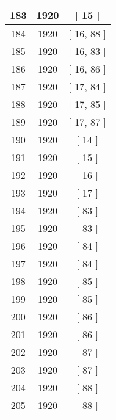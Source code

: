 \begin{center}
\begin{longtable}[H]{|| c c c ||}
\hline
183 & 1920 & [ 15 ] \\ 
\hline
184 & 1920 & [ 16, 88 ] \\ 
\hline
185 & 1920 & [ 16, 83 ] \\ 
\hline
186 & 1920 & [ 16, 86 ] \\ 
\hline
187 & 1920 & [ 17, 84 ] \\ 
\hline
188 & 1920 & [ 17, 85 ] \\ 
\hline
189 & 1920 & [ 17, 87 ] \\ 
\hline
190 & 1920 & [ 14 ] \\ 
\hline
191 & 1920 & [ 15 ] \\ 
\hline
192 & 1920 & [ 16 ] \\ 
\hline
193 & 1920 & [ 17 ] \\ 
\hline
194 & 1920 & [ 83 ] \\ 
\hline
195 & 1920 & [ 83 ] \\ 
\hline
196 & 1920 & [ 84 ] \\ 
\hline
197 & 1920 & [ 84 ] \\ 
\hline
198 & 1920 & [ 85 ] \\ 
\hline
199 & 1920 & [ 85 ] \\ 
\hline
200 & 1920 & [ 86 ] \\ 
\hline
201 & 1920 & [ 86 ] \\ 
\hline
202 & 1920 & [ 87 ] \\ 
\hline
203 & 1920 & [ 87 ] \\ 
\hline
204 & 1920 & [ 88 ] \\ 
\hline
205 & 1920 & [ 88 ] \\ 
\hline
\end{longtable}
\end{center}

